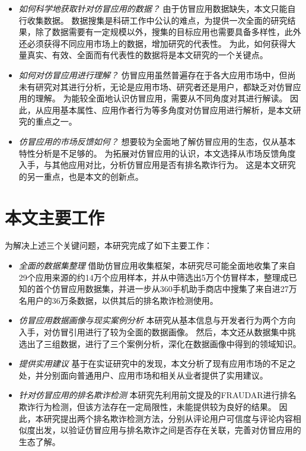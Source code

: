 \begin{itemize}
	\setlength{\itemsep}{1pt}
	      \setlength{\parskip}{0pt}
	      \setlength{\parsep}{0pt}
	\item \emph{如何科学地获取针对仿冒应用的数据？} \quad
	      由于仿冒应用数据缺失，本文只能自行收集数据。
	      数据搜集是科研工作中公认的难点，为提供一次全面的研究结果，除了数据需要有一定规模以外，搜集的目标应用也需要具备多样性，此外还必须获得不同应用市场上的数据，增加研究的代表性。
	      为此，如何获得大量真实、有效、全面而有代表性的数据将是本文研究的一个关键点。

	\item \emph{如何对仿冒应用进行理解？} \quad
	      仿冒应用虽然普遍存在于各大应用市场中，但尚未有研究对其进行分析，无论是应用市场、研究者还是用户，都缺乏对仿冒应用的理解。
	      为能较全面地认识仿冒应用，需要从不同角度对其进行解读。
	      因此，从应用基本属性、应用作者行为等多角度对仿冒应用进行解析，是本文研究的重点之一。

	\item \emph{仿冒应用的市场反馈如何？} \quad
	      想要较为全面地了解仿冒应用的生态，仅从基本特性分析是不足够的。
	      为拓展对仿冒应用的认识，本文选择从市场反馈角度入手，与其他应用对比，分析仿冒应用是否有排名欺诈行为。
	      这是本文研究的另一重点，也是本文的创新点。
\end{itemize}

\section{本文主要工作}
为解决上述三个关键问题，本研究完成了如下主要工作：

\begin{itemize}
	\setlength{\itemsep}{1pt}
	      \setlength{\parskip}{0pt}
	      \setlength{\parsep}{0pt}
	\item \emph{全面的数据集整理} \quad
	      借助仿冒应用收集框架\mytool，本研究尽可能全面地收集了来自29个应用来源的约14万个应用样本，并从中筛选出5万个仿冒样本，整理成已知的首个仿冒应用数据集，并进一步从360手机助手商店中搜集了来自进27万名用户的36万条数据，以供其后的排名欺诈检测使用。

	\item \emph{仿冒应用数据画像与现实案例分析} \quad
	      本研究从基本信息与开发者行为两个方向入手，对仿冒引用进行了较为全面的数据画像。
	      然后，本文还从数据集中挑选出了三组数据，进行了三个案例分析，深化在数据画像中得到的领域知识。

	\item \emph{提供实用建议} \quad
	      基于在实证研究中的发现，本文分析了现有应用市场的不足之处，并分别面向普通用户、应用市场和相关从业者提供了实用建议。

	\item \emph{针对仿冒应用的排名欺诈检测} \quad
	      本研究先利用前文提及的FRAUDAR进行排名欺诈行为检测，但该方法存在一定局限性，未能提供较为良好的结果。
	      因此，本研究提出两个排名欺诈检测方法，分别从评论用户可信度与评论内容相似度出发，以验证仿冒应用与排名欺诈之间是否存在关联，完善对仿冒应用的生态了解。
\end{itemize}

